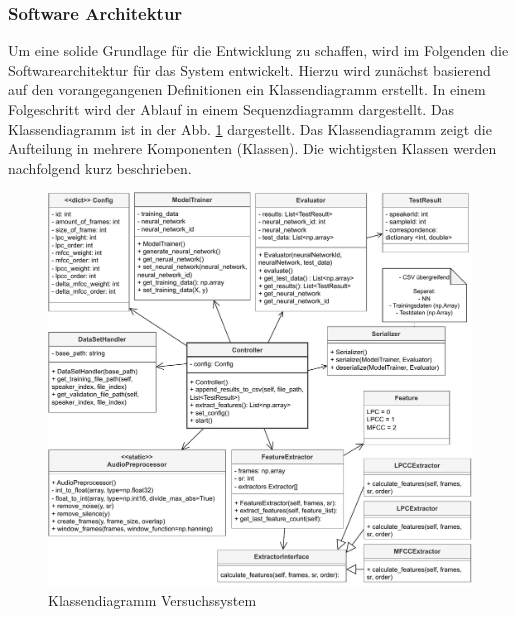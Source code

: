 \subsubsection{Software Architektur}
Um eine solide Grundlage für die Entwicklung zu schaffen, wird im Folgenden die Softwarearchitektur für das System entwickelt.
Hierzu wird zunächst basierend auf den vorangegangenen Definitionen ein Klassendiagramm erstellt.
In einem Folgeschritt wird der Ablauf in einem Sequenzdiagramm dargestellt. %
\newparagraph
Das Klassendiagramm ist in der Abb. \ref{fig:klassendiagram-versuchssystem} dargestellt.
Das Klassendiagramm zeigt die Aufteilung in mehrere Komponenten (Klassen).
Die wichtigsten Klassen werden nachfolgend kurz beschrieben.
\begin{figure}[H]
    \centering
    \includegraphics[width=\textwidth, keepaspectratio]{images/klassendiagram-versuchssystem.pdf}
    \caption{Klassendiagramm Versuchssystem}
    \label{fig:klassendiagram-versuchssystem}
\end{figure}\noindent


